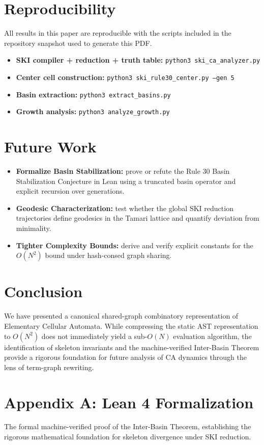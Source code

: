 \documentclass[11pt]{article}
\begin{document}
\section{Reproducibility}
All results in this paper are reproducible with the scripts included in the repository snapshot used to generate this PDF.

\begin{itemize}
    \item \textbf{SKI compiler + reduction + truth table:} \texttt{python3 ski\_ca\_analyzer.py}
    \item \textbf{Center cell construction:} \texttt{python3 ski\_rule30\_center.py --gen 5}
    \item \textbf{Basin extraction:} \texttt{python3 extract\_basins.py}
    \item \textbf{Growth analysis:} \texttt{python3 analyze\_growth.py}
\end{itemize}

\section{Future Work}
\begin{itemize}
    \item \textbf{Formalize Basin Stabilization:} prove or refute the Rule 30 Basin Stabilization Conjecture in Lean using a truncated basin operator and explicit recursion over generations.
    \item \textbf{Geodesic Characterization:} test whether the global SKI reduction trajectories define geodesics in the Tamari lattice and quantify deviation from minimality.
    \item \textbf{Tighter Complexity Bounds:} derive and verify explicit constants for the $O(N^2)$ bound under hash-consed graph sharing.
\end{itemize}

\section{Conclusion}
We have presented a canonical shared-graph combinatory representation of Elementary Cellular Automata. While compressing the static AST representation to $O(N^2)$ does not immediately yield a sub-$O(N)$ evaluation algorithm, the identification of skeleton invariants and the machine-verified Inter-Basin Theorem provide a rigorous foundation for future analysis of CA dynamics through the lens of term-graph rewriting.

\section*{Appendix A: Lean 4 Formalization}
The formal machine-verified proof of the Inter-Basin Theorem, establishing the rigorous mathematical foundation for skeleton divergence under SKI reduction.
\end{document}

